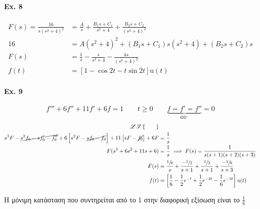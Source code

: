     \paragraph{Ex. 8}
    \begin{align*}
    F(s) = \frac{16}{s(s^2+4)^2} &=
    \frac{A}{s} + \frac{B_1s + C_1}{s^2+4} + \frac{B_2s+C_2}{(s^2+4)^2} \\
    16 &= A(s^2+4)^2 + (B_1s+C_1)s(s^2+4) + (B_2s+C_2)s \\
    F(s) &= \frac{1}{s} - \frac{s}{s^2+4} - \frac{4s}{(s^2+4)^2} \\
    f(t) &= \left[ 1-\cos 2t - t\sin 2t \right] \mathrm u(t)
    \end{align*}
    
    \paragraph{Ex. 9}
    \[
    f''' + 6f'' + 11f' + 6f = 1 \qquad t\geq 0 \qquad
    \underbrace{f=f'=f''}_{@ 0^-}=0
    \]
    \begin{align*}
    \mathscr{LT}\left\lbrace \qquad \right\rbrace & \\
    s^3F - \cancel{s^2f_0 - sf_0' -f_0''}
    +6 \left[ s^2F-\cancel{sf_0-f_0} \right]
     + 11 \left[ sF - \cancel{f_0} \right] + 6F
    &= \frac{1}{s} \\
    F(s^3+6s^2+11s+6)&= \frac{1}{s}
    \implies F(s) = \frac{1}{s(s+1)(s+2)(s+3)}
    \\ F(s) &= \frac{\sfrac{1}{6} }{s}
    + \frac{-\sfrac{1}{2} }{s+1}
    + \frac{\sfrac{1}{2} }{s+1}
    + \frac{-\sfrac{1}{6} }{s+3} \\
    f(t) &= \left[
    \frac{1}{6}-\frac{1}{2}e^{-t}+\frac{1}{2}e^{-2t}-\frac{1}{6}e^{-3t}
    \right]\mathrm u(t)
    \end{align*}
    
    Η μόνιμη κατάσταση που συντηρείται από το 1 στην διαφορική εξίσωση είναι το
    \( \frac{1}{6} \)
